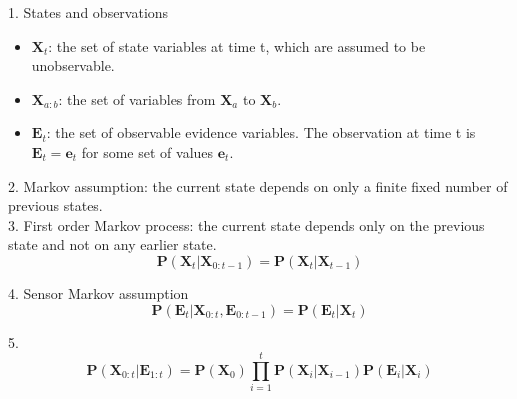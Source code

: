 \documentclass[12pt]{article}
\begin{document}
1. States and observations
\begin{itemize}
\item $\boldsymbol{X}_t$: the set of state variables at time t, which are assumed to be unobservable.
\item $\boldsymbol{X}_{a:b}$: the set of variables from $\boldsymbol{X}_a$ to $\boldsymbol{X}_b$.
\item $\boldsymbol{E}_t$: the set of observable evidence variables. The observation at time t is $\boldsymbol{E}_t = \boldsymbol{e}_t$ for some set of values $\boldsymbol{e}_t$.
\end{itemize}

2. Markov assumption: the current state depends on only a finite fixed number of previous states. \\

3. First order Markov process: the current state depends only on the previous state and not on any earlier state.
\begin{equation*}
\boldsymbol{P}(\boldsymbol{X}_t | \boldsymbol{X}_{0:t-1})
= \boldsymbol{P}(\boldsymbol{X}_t | \boldsymbol{X}_{t-1})
\end{equation*}

4. Sensor Markov assumption
\begin{equation*}
\boldsymbol{P}(\boldsymbol{E}_t | \boldsymbol{X}_{0:t}, \boldsymbol{E}_{0:t-1})
= \boldsymbol{P}(\boldsymbol{E}_t | \boldsymbol{X}_t)
\end{equation*}

5.
\begin{equation*}
\boldsymbol{P}(\boldsymbol{X}_{0:t} | \boldsymbol{E}_{1:t})
= \boldsymbol{P}(\boldsymbol{X}_0)
  \prod^t_{i=1} \boldsymbol{P}(\boldsymbol{X}_i | \boldsymbol{X}_{i-1})
  \boldsymbol{P}(\boldsymbol{E}_i | \boldsymbol{X}_i)
\end{equation*}
\end{document}
